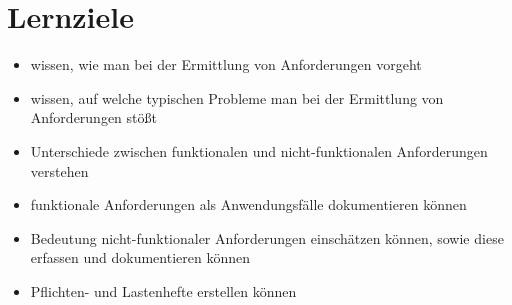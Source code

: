 \section{Lernziele}
\begin{itemize}
    \item wissen, wie man bei der Ermittlung von Anforderungen vorgeht
    \item wissen, auf welche typischen Probleme man bei der Ermittlung von Anforderungen stößt
    \item Unterschiede zwischen funktionalen und nicht-funktionalen Anforderungen verstehen
    \item funktionale Anforderungen als Anwendungsfälle dokumentieren können
    \item Bedeutung nicht-funktionaler Anforderungen einschätzen können, sowie diese erfassen und dokumentieren können
    \item Pflichten- und Lastenhefte erstellen können
\end{itemize}